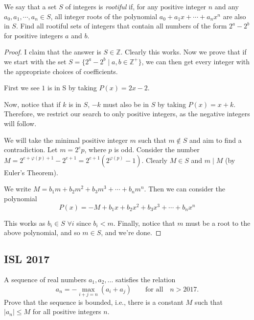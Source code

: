 \documentclass{article}
\theoremstyle{mytheoremstyle}
\theoremstyle{mytheoremstyle}
\theoremstyle{myproblemstyle}
\begin{document}
    \begin{problem}[2019 N3]
        We say that a set $S$ of integers is \textit{rootiful} if, for any positive integer $n$ and any $a_0, a_1, \cdots, a_n \in S$, all integer roots of the polynomial $a_0+a_1x+\cdots+a_nx^n$ are also in $S$. Find all rootiful sets of integers that contain all numbers of the form $2^a - 2^b$ for positive integers $a$ and $b$.
    \end{problem}

    \begin{proof}
        I claim that the answer is $S \in \mathbb{Z}$. Clearly this works. Now we prove that if we start with the set $S = \{2^a - 2^b \mid a, b \in \mathbb{Z}^+\}$, we can then get every integer with the appropriate choices of coefficients. 
        
        First we see $1$ is in S by taking $P(x) = 2x - 2$.

        Now, notice that if $k$ is in $S$, $-k$ must also be in $S$ by taking $P(x) = x + k$. Therefore, we restrict our search to only positive integers, as the negative integers will follow.

        We will take the minimal positive integer $m$ such that $m \notin S$ and aim to find a contradiction. Let $m = 2^ep$, where $p$ is odd. Consider the number $M = 2^{e + \varphi(p) + 1} - 2^{e+1} = 2^{e+1}(2^{\varphi(p)} - 1)$. Clearly $M \in S$ and $m \mid M$ (by Euler's Theorem).
        
        We write $M = b_1m + b_2m^2 + b_3m^3 + \cdots + b_nm^n$. Then we can consider the polynomial \[P(x) = -M + b_1x + b_2x^2 + b_3x^3 + \cdots + b_nx^n\]

        This works as $b_i \in S$ $\forall i$ since $b_i < m$. Finally, notice that $m$ must be a root to the above polynomial, and so $m \in S$, and we're done.
    \end{proof}


    
    \subsection{ISL 2017}
    \begin{problem}[2017 A4]
        A sequence of real numbers $a_1,a_2,\ldots$ satisfies the relation
\[ a_n=-\max_{i+j=n}(a_i+a_j)\qquad\text{for all}\quad n>2017. \]
Prove that the sequence is bounded, i.e., there is a constant $M$ such that $|a_n|\leq M$ for all positive integers $n$.
    \end{problem}
\end{document}
